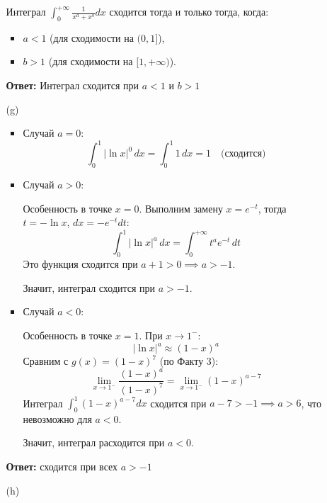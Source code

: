 \documentclass[a4paper]{article}
\begin{document}
\begin{enumerate}
\begin{enumerate}
    Интеграл \(\int_{0}^{+\infty} \frac{1}{x^a + x^b} dx\) сходится
    тогда и только тогда, когда:
    \begin{itemize}
    \item 
    \(a < 1\) (для сходимости на \((0, 1]\)),
    \item
    \(b > 1\) (для сходимости на \([1, +\infty)\)).
    \end{itemize}

    \textbf{Ответ: } Интеграл сходится при  \(a < 1\)  и  \(b>1\) \\

    \item[(g)]\begin{itemize}
      \item Случай \(a = 0\):
      \[
      \int_{0}^{1} |\ln x|^0 \, dx = \int_{0}^{1} 1 \, dx = 1 \quad \text{(сходится)}
      \]
      \item Случай \(a > 0\):
      
       Особенность в точке \(x = 0\). Выполним замену \(x = e^{-t}\),
        тогда \(t = -\ln x\), \(dx = -e^{-t} dt\):  
      \[
      \int_{0}^{1} |\ln x|^a \, dx = \int_{0}^{+\infty} t^a e^{-t} \, dt
      \]  
      Это функция  сходится при
       \(a + 1 > 0 \implies a > -1\).  
      
       Значит, интеграл сходится при \(a > -1\).

      \item Случай \(a < 0\):
      
      Особенность в точке \(x = 1\). При \(x \to 1^-\):  
      \[
      |\ln x|^a \approx (1 - x)^a
      \]  
      Сравним с \(g(x) = (1 - x)^7\) (по Факту 3):  
      \[
      \lim_{x \to 1^-} \frac{(1 - x)^a}{(1 - x)^7} = \lim_{x \to 1^-} (1 - x)^{a - 7}
      \]  
      Интеграл \(\int_{0}^{1} (1 - x)^{a - 7} dx\) сходится при 
      \(a - 7 > -1 \implies a > 6\), что невозможно для \(a < 0\).  
      
      Значит, интеграл расходится при \(a < 0\). 
    \end{itemize}
    \textbf{Ответ: } сходится при всех $a > -1$\\

    \item[(h)]
  \end{enumerate}
  
  
\end{enumerate}
\end{document}

